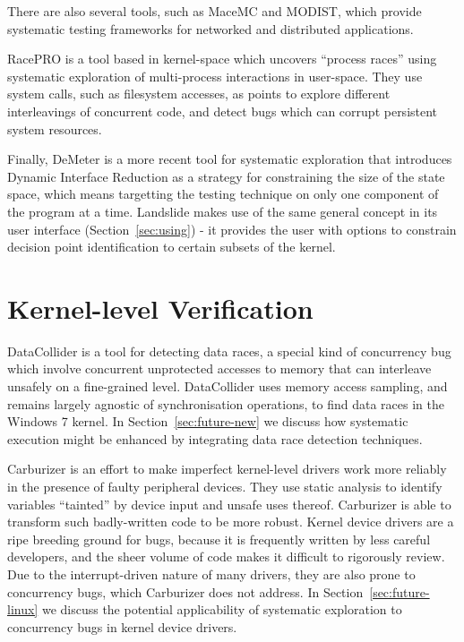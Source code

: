 There are also several tools, such as MaceMC\cite{macemc} and MODIST\cite{modist}, which provide systematic testing frameworks for networked and distributed applications.

RacePRO\cite{racepro} is a tool based in kernel-space which uncovers ``process races'' using systematic exploration of multi-process interactions in user-space. They use system calls, such as filesystem accesses, as points to explore different interleavings of concurrent code, and detect bugs which can corrupt persistent system resources.

Finally, DeMeter\cite{demeter} is a more recent tool for systematic exploration that introduces Dynamic Interface Reduction as a strategy for constraining the size of the state space, which means targetting the testing technique on only one component of the program at a time. Landslide makes use of the same general concept in its user interface (Section~\ref{sec:using}) - it provides the user with options to constrain decision point identification to certain subsets of the kernel.

\section{Kernel-level Verification}

DataCollider\cite{datacollider} is a tool for detecting data races, a special kind of concurrency bug which involve concurrent unprotected accesses to memory that can interleave unsafely on a fine-grained level.
DataCollider uses memory access sampling, and remains largely agnostic of synchronisation operations, to find data races in the Windows 7 kernel.
In Section~\ref{sec:future-new} we discuss how systematic execution might be enhanced by integrating data race detection techniques.

Carburizer\cite{carburizer} is an effort to make imperfect kernel-level drivers work more reliably in the presence of faulty peripheral devices. They use static analysis to identify variables ``tainted'' by device input and unsafe uses thereof. Carburizer is able to transform such badly-written code to be more robust.
Kernel device drivers are a ripe breeding ground for bugs, because it is frequently written by less careful developers, and the sheer volume of code makes it difficult to rigorously review.
Due to the interrupt-driven nature of many drivers, they are also prone to concurrency bugs, which Carburizer does not address.
In Section~\ref{sec:future-linux} we discuss the potential applicability of systematic exploration to concurrency bugs in kernel device drivers.

